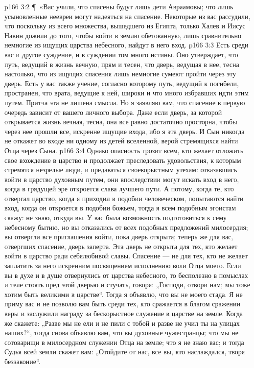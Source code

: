 \vs p166 3:2 \P\ «Вас учили, что спасены будут лишь дети Авраамовы; что лишь усыновленные неевреи могут надеяться на спасение. Некоторые из вас рассудили, что поскольку из всего множества, вышедшего из Египта, только Халев и Иисус Навин дожили до того, чтобы войти в землю обетованную, лишь сравнительно немногие из ищущих царства небесного, найдут в него вход.
\vs p166 3:3 Есть среди вас и другое суждение, и в суждении том много истины. Оно утверждает, что путь, ведущий в жизнь вечную, прям и тесен, что дверь, ведущая в нее, тесна настолько, что из ищущих спасения лишь немногие сумеют пройти через эту дверь. Есть у вас также учение, согласно которому путь, ведущий к погибели, пространен, что врата, ведущие к ней, широки и что много избравших идти этим путем. Притча эта не лишена смысла. Но я заявляю вам, что спасение в первую очередь зависит от вашего личного выбора. Даже если дверь, за которой открывается жизнь вечная, тесна, она все равно достаточно просторна, чтобы через нее прошли все, искренне ищущие входа, ибо я эта дверь. И Сын никогда не откажет во входе ни одному из детей вселенной, верой стремящихся найти Отца через Сына.
\vs p166 3:4 Однако опасность грозит всем, кто желает отложить свое вхождение в царство и продолжает преследовать удовольствия, к которым стремятся незрелые люди, и предаваться своекорыстным утехам: отказавшись войти в царство духовным путем, они впоследствии могут искать вход в него, когда в грядущей эре откроется слава лучшего пути. А потому, когда те, кто отвергал царство, когда я приходил в подобии человеческом, попытаются найти вход, когда он откроется в подобии божьем, тогда я всем подобным эгоистам скажу: не знаю, откуда вы. У вас была возможность подготовиться к сему небесному бытию, но вы отказались от всех подобных предложений милосердия; вы отвергли все приглашения войти, пока дверь открыта; теперь же для вас, отвергших спасение, дверь заперта. Эта дверь не открыта для тех, кто желает войти в царство ради себялюбивой славы. Спасение --- не для тех, кто не желает заплатить за него искренним посвящением исполнению воли Отца моего. Если вы в духе и в душе отвернулись от царства небесного, то бесполезно в помыслах и теле стоять пред этой дверью и стучать, говоря: „Господи, отвори нам; мы тоже хотим быть великими в царстве“. Тогда я объявлю, что вы не моего стада. Я не приму вас и не позволю вам быть среди тех, кто сражается в благом сражении веры и заслужили награду за бескорыстное служение в царстве на земле. Когда же скажете: „Разве мы не ели и не пили с тобой и разве не учил ты на улицах наших?“, тогда снова объявлю вам, что вы духовные чужестранцы; что мы не сотоварищи в милосердном служении Отца на земле; что я не знаю вас; и тогда Судья всей земли скажет вам: „Отойдите от нас, все вы, кто наслаждался, творя беззаконие“.
